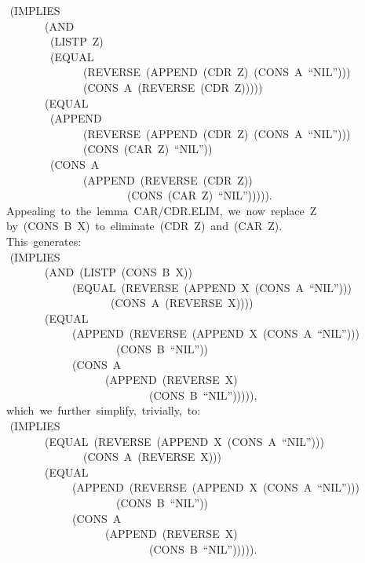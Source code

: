 \documentclass[10pt]{book}
\newenvironment{pubasis}{\begin{flushleft}}{\end{flushleft}}
\begin{document}
\begin{pubasis}
~~	~~(IMPLIES\\
~~~~~~~~~~~(AND\\
~~~~~~~~~~~~(LISTP~Z)\\
~~~~~~~~~~~~(EQUAL\\
~~~~~~~~~~~~~~~~~~(REVERSE~(APPEND~(CDR~Z)~(CONS~A~``NIL'')))\\
~~~~~~~~~~~~~~~~~~(CONS~A~(REVERSE~(CDR~Z)))))\\
~~~~~~~~~~~(EQUAL\\
~~~~~~~~~~~~(APPEND\\
~~~~~~~~~~~~~~~~~~(REVERSE~(APPEND~(CDR~Z)~(CONS~A~``NIL'')))\\
~~~~~~~~~~~~~~~~~~(CONS~(CAR~Z)~``NIL''))\\
~~~~~~~~~~~~(CONS~A\\
~~~~~~~~~~~~~~~~~~(APPEND~(REVERSE~(CDR~Z))\\
~~~~~~~~~~~~~~~~~~~~~~~~~~(CONS~(CAR~Z)~``NIL''))))).\\

~~~~Appealing~to~the~lemma~CAR/CDR.ELIM,~we~now~replace~Z\\
~~~~by~(CONS~B~X)~to~eliminate~(CDR~Z)~and~(CAR~Z).\\
~~~~This~generates:\\

~~	~~(IMPLIES\\
~~~~~~~~~~~(AND~(LISTP~(CONS~B~X))\\
~~~~~~~~~~~~~~~~(EQUAL~(REVERSE~(APPEND~X~(CONS~A~``NIL'')))\\
~~~~~~~~~~~~~~~~~~~~~~~(CONS~A~(REVERSE~X))))\\
~~~~~~~~~~~(EQUAL\\
~~~~~~~~~~~~~~~~(APPEND~(REVERSE~(APPEND~X~(CONS~A~``NIL'')))\\
~~~~~~~~~~~~~~~~~~~~~~~~(CONS~B~``NIL''))\\
~~~~~~~~~~~~~~~~(CONS~A\\
~~~~~~~~~~~~~~~~~~~~~~(APPEND~(REVERSE~X)\\
~~~~~~~~~~~~~~~~~~~~~~~~~~~~~~(CONS~B~``NIL''))))),\\

~~~~which~we~further~simplify,~trivially,~to:\\

~~	~~(IMPLIES\\
~~~~~~~~~~~(EQUAL~(REVERSE~(APPEND~X~(CONS~A~``NIL'')))\\
~~~~~~~~~~~~~~~~~~(CONS~A~(REVERSE~X)))\\
~~~~~~~~~~~(EQUAL\\
~~~~~~~~~~~~~~~~(APPEND~(REVERSE~(APPEND~X~(CONS~A~``NIL'')))\\
~~~~~~~~~~~~~~~~~~~~~~~~(CONS~B~``NIL''))\\
~~~~~~~~~~~~~~~~(CONS~A\\
~~~~~~~~~~~~~~~~~~~~~~(APPEND~(REVERSE~X)\\
~~~~~~~~~~~~~~~~~~~~~~~~~~~~~~(CONS~B~``NIL''))))).\\


\end{pubasis}
\end{document}
